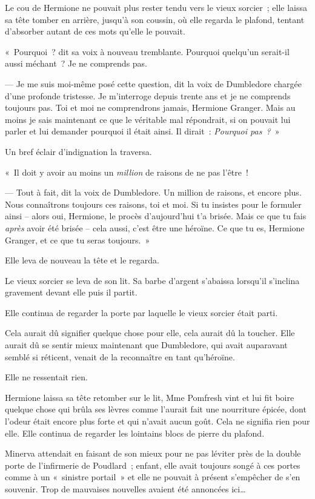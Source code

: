 Le cou de Hermione ne pouvait plus rester tendu vers le vieux sorcier~; elle laissa sa tête tomber en arrière, jusqu'à son coussin, où elle regarda le plafond, tentant d'absorber autant de ces mots qu'elle le pouvait.

«~Pourquoi~? dit sa voix à nouveau tremblante. Pourquoi quelqu'un serait-il aussi méchant~? Je ne comprends pas.

--- Je me suis moi-même posé cette question, dit la voix de Dumbledore chargée d'une profonde tristesse. Je m'interroge depuis trente ans et je ne comprends toujours pas. Toi et moi ne comprendrons jamais, Hermione Granger. Mais au moins je sais maintenant ce que le véritable mal répondrait, si on pouvait lui parler et lui demander pourquoi il était ainsi. Il dirait~: \emph{Pourquoi pas~?}~»

Un bref éclair d'indignation la traversa.

«~Il doit y avoir au moins un \emph{million} de raisons de ne pas l'être~!

--- Tout à fait, dit la voix de Dumbledore. Un million de raisons, et encore plus. Nous connaîtrons toujours ces raisons, toi et moi. Si tu insistes pour le formuler ainsi -- alors oui, Hermione, le procès d'aujourd'hui t'a brisée. Mais ce que tu fais \emph{après} avoir été brisée -- cela aussi, c'est être une héroïne. Ce que tu es, Hermione Granger, et ce que tu seras toujours.~»

Elle leva de nouveau la tête et le regarda.

Le vieux sorcier se leva de son lit. Sa barbe d'argent s'abaissa lorsqu'il s'inclina gravement devant elle puis il partit.

Elle continua de regarder la porte par laquelle le vieux sorcier était parti.

Cela aurait dû signifier quelque chose pour elle, cela aurait dû la toucher. Elle aurait dû se sentir mieux maintenant que Dumbledore, qui avait auparavant semblé si réticent, venait de la reconnaître en tant qu'héroïne.

Elle ne ressentait rien.

Hermione laissa sa tête retomber sur le lit, Mme Pomfresh vint et lui fit boire quelque chose qui brûla ses lèvres comme l'aurait fait une nourriture épicée, dont l'odeur était encore plus forte et qui n'avait aucun goût. Cela ne signifia rien pour elle. Elle continua de regarder les lointains blocs de pierre du plafond.

\later

Minerva attendait en faisant de son mieux pour ne pas léviter près de la double porte de l'infirmerie de Poudlard~; enfant, elle avait toujours songé à ces portes comme à un «~sinistre portail~» et elle ne pouvait à présent s'empêcher de s'en souvenir. Trop de mauvaises nouvelles avaient été annoncées ici…

